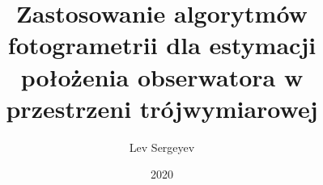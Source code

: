 \documentclass[eng, printmode, final]{mgr} %
\title{Zastosowanie algorytmów fotogrametrii dla estymacji położenia obserwatora w przestrzeni trójwymiarowej}
\author{Lev Sergeyev}
\date{2020} %
\begin{document}

\maketitle

\tableofcontents
\listoffigures

\relax








\end{document}
